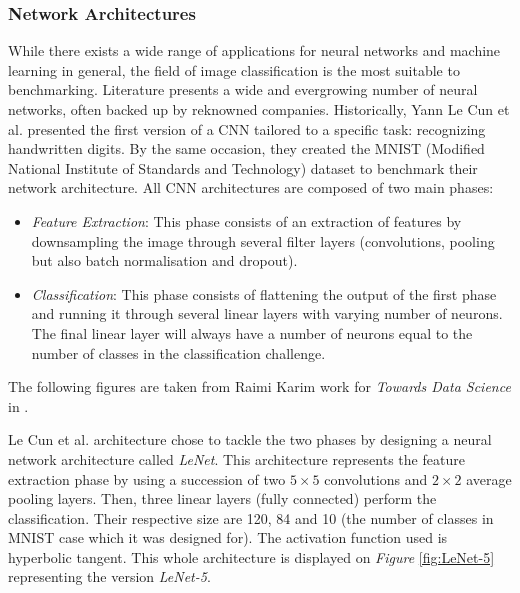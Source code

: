 
\subsubsection{Network Architectures}

While there exists a wide range of applications for neural networks and machine learning in general, the field of image classification is the most suitable to benchmarking. Literature presents a wide and evergrowing number of neural networks, often backed up by reknowned companies. Historically, Yann Le Cun et al. \cite{LeCun1998} presented the first version of a CNN tailored to a specific task: recognizing handwritten digits. By the same occasion, they created the MNIST (Modified National Institute of Standards and Technology) dataset to benchmark their network architecture. All CNN architectures are composed of two main phases:
\begin{itemize}
  \item \emph{Feature Extraction}: This phase consists of an extraction of features by downsampling the image through several filter layers (convolutions, pooling but also batch normalisation and dropout).
  \item \emph{Classification}: This phase consists of flattening the output of the first phase and running it through several linear layers with varying number of neurons. The final linear layer will always have a number of neurons equal to the number of classes in the classification challenge.
\end{itemize}

The following figures are taken from Raimi Karim work for \emph{Towards Data Science} in \cite{Karim2020}.

Le Cun et al. \cite{LeCun1998} architecture chose to tackle the two phases by designing a neural network architecture called \emph{LeNet}. This architecture represents the feature extraction phase by using a succession of two $5 \times 5$ convolutions and $2 \times 2$ average pooling layers. Then, three linear layers (fully connected) perform the classification. Their respective size are 120, 84 and 10 (the number of classes in MNIST \cite{LeCun2010} case which it was designed for). The activation function used is hyperbolic tangent. This whole architecture is displayed on \emph{Figure} \ref{fig:LeNet-5} representing the version \emph{LeNet-5}.

